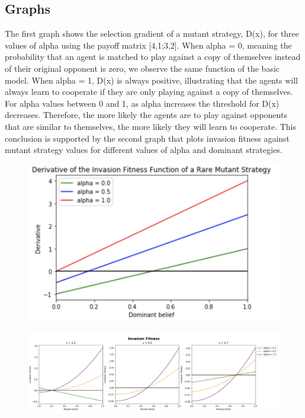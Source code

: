 \documentclass[]{llncs}
\begin{document}
\subsection{Graphs}

The first graph shows the selection gradient of a mutant strategy, D(x), for three values of alpha using the payoff matrix [4,1;3,2]. When alpha = 0, meaning the  probability that an agent is matched to play against a copy of themselves instead of their original opponent is zero, we observe the same function of the basic model. When alpha = 1, D(x) is always positive, illustrating that the agents will always learn to cooperate if they are only playing against a copy of themselves. For alpha values between 0 and 1, as alpha increases the threshold for D(x) decreases. Therefore, the more likely the agents are to play against opponents that are similar to themselves, the more likely they will learn to cooperate. This conclusion is supported by the second graph that plots invasion fitness against mutant strategy values for different values of alpha and dominant strategies. 

\begin{figure}
\centering
\includegraphics[width=12cm]{images/invasion_fitness_alpha}
\end{figure}

\begin{figure}
\centering
\includegraphics[width=15cm]{images/inv_fit_alpha}
\end{figure}
\end{document}

